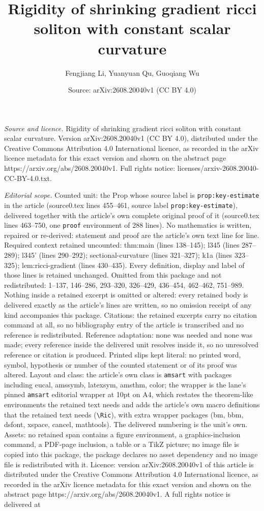 \documentclass[10pt,a4paper]{amsart}
\title[Rigidity of shrinking gradient ricci soliton with constant s]{Rigidity of shrinking gradient ricci soliton with constant scalar curvature}
\author{Fengjiang Li, Yuanyuan Qu, Guoqiang Wu}
\date{Source: arXiv:2608.20040v1 (CC BY 4.0)}
\begin{document}
\maketitle

\noindent\emph{Source and licence.} Rigidity of shrinking gradient ricci soliton with constant scalar curvature. Version arXiv:2608.20040v1 (CC BY 4.0), distributed under the Creative Commons Attribution 4.0 International licence, as recorded in the arXiv licence metadata for this exact version and shown on the abstract page https://arxiv.org/abs/2608.20040v1. Full rights notice: licenses/arxiv-2608.20040-CC-BY-4.0.txt.\par\smallskip

\noindent\textit{Editorial scope.} Counted unit: the Prop whose source label is \texttt{prop:key-estimate} in the article (source0.tex lines 455--461, source label \texttt{prop:key-estimate}), delivered together with the article's own complete original proof of it (source0.tex lines 463--750, one \texttt{proof} environment of 288 lines). No mathematics is written, repaired or re-derived: statement and proof are the article's own text line for line. Required context retained uncounted: thm:main (lines 138--145); l345 (lines 287--289); l345' (lines 290--292); sectional-curvature (lines 321--327); k1a (lines 323--325); lem:ricci-gradient (lines 430--435). Every definition, display and label of those lines is retained unchanged. Omitted from this package and not redistributed: 1--137, 146--286, 293--320, 326--429, 436--454, 462--462, 751--989. Nothing inside a retained excerpt is omitted or altered: every retained body is delivered exactly as the article's lines are written, so no omission receipt of any kind accompanies this package. Citations: the retained excerpts carry no citation command at all, so no bibliography entry of the article is transcribed and no reference is redistributed. Reference adaptation: none was needed and none was made; every reference inside the delivered unit resolves inside it, so no unresolved reference or citation is produced. Printed slips kept literal: no printed word, symbol, hypothesis or number of the counted statement or of its proof was altered. Layout and class: the article's own class is \texttt{amsart} with packages including eucal, amssymb, latexsym, amsthm, color; the wrapper is the lane's pinned \texttt{amsart} editorial wrapper at 10pt on A4, which restates the theorem-like environments the retained text needs and adds the article's own macro definitions that the retained text needs (\texttt{\textbackslash Ric}), with extra wrapper packages (bm, bbm, dsfont, xspace, cancel, mathtools). The delivered numbering is the unit's own. Assets: no retained span contains a figure environment, a graphics-inclusion command, a PDF-page inclusion, a table or a TikZ picture; no image file is copied into this package, the package declares no asset dependency and no image file is redistributed with it. Licence: version arXiv:2608.20040v1 of this article is distributed under the Creative Commons Attribution 4.0 International licence, as recorded in the arXiv licence metadata for this exact version and shown on the abstract page https://arxiv.org/abs/2608.20040v1. A full rights notice is delivered at 
\end{document}
